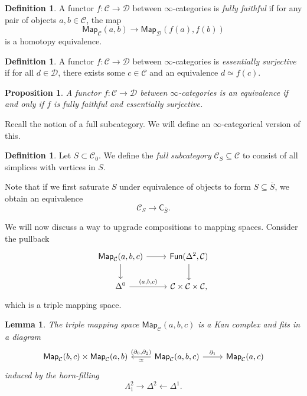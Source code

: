 \documentclass[10pt, oneside]{memoir}
\newtheorem{prop}[thm]{Proposition}
\newtheorem{lem}[thm]{Lemma}
\theoremstyle{definition}
\newtheorem{defn}[thm]{Definition}
\theoremstyle{remark}
\theoremstyle{plain}
\theoremstyle{definition}
\theoremstyle{remark}
\newcommand{\mc}[1]{\mathcal{#1}}
\newcommand{\ms}[1]{\mathsf{#1}}
\newcommand{\1}{\mathbf{1}}
\newcommand{\2}{\mathbf{2}}
\newcommand{\3}{\mathbf{3}}
\begin{document}
\begin{defn}
    A functor \(f \colon \mc{C} \to \mc{D} \) between \(\infty \)-categories is \textit{fully faithful} if for any pair of objects \(a,b \in \mc{C} \), the map
    \[ \ms{Map}_{\mc{C}}(a,b) \to \ms{Map}_{\mc{D}}(f(a), f(b)) \]
    is a homotopy equivalence.
\end{defn}

\begin{defn}
    A functor \(f \colon \mc{C} \to \mc{D} \) between \(\infty \)-categories is \textit{essentially surjective} if for all \(d \in \mc{D} \), there exists some \(c \in \mc{C} \) and an equivalence \(d \simeq f(c) \).
\end{defn}

\begin{prop}
    A functor \(f \colon \mc{C} \to \mc{D} \) between \(\infty \)-categories is an equivalence if and only if \(f \) is fully faithful and essentially surjective.
\end{prop}

Recall the notion of a full subcategory. We will define an \(\infty \)-categorical version of this.

\begin{defn}
    Let \(S \subset \mc{C}_0 \). We define the \textit{full subcategory} \(\mc{C}_S \subseteq \mc{C} \) to consist of all simplices with vertices in \(S \).
\end{defn}

Note that if we first saturate \(S \) under equivalence of objects to form \(S \subseteq \bar{S} \), we obtain an equivalence
\[ \mc{C}_S \to \ms{C}_{\bar{S}}. \]

We will now discuss a way to upgrade compositions to mapping spaces. Consider the pullback
\begin{equation*}
\begin{tikzcd}
    \ms{Map}_{\mc{C}}(a,b,c) \ar{r} \ar{d} & \ms{Fun}(\Delta^2, \mc{C}) \ar{d} \\
    \Delta^0 \ar{r}{(a,b,c)} & \mc{C} \times \mc{C} \times \mc{C},
\end{tikzcd}
\end{equation*}
which is a triple mapping space.

\begin{lem}
    The triple mapping space \(\ms{Map}_{\mc{C}}(a,b,c) \) is a Kan complex and fits in a diagram
    \begin{equation*}
    \begin{tikzcd}
        \ms{Map}_{\mc{C}}(b,c) \times \ms{Map}_{\mc{C}}(a,b) & \ms{Map}_{\mc{C}}(a,b,c) \ar{l}[swap]{(\partial_0, \partial_2)}{\simeq} \ar{r}{\partial_1} & \ms{Map}_{\mc{C}}(a,c)
    \end{tikzcd}
    \end{equation*}
    induced by the horn-filling
    \[ \Lambda_1^2 \to \Delta^2 \gets \Delta^1. \]
\end{lem}
\end{document}
